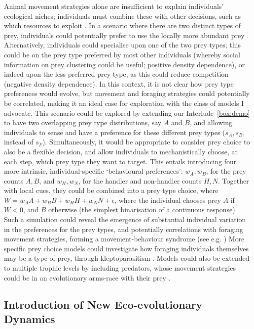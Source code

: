 Animal movement strategies alone are insufficient to explain individuals' ecological niches; individuals must combine these with other decisions, such as which resources to exploit \parencite{vangils2015,pulliam1974}.
In a scenario where there are two distinct types of prey, individuals could potentially prefer to use the locally more abundant prey \parencite{emlen1966,pulliam1974}.
Alternatively, individuals could specialise upon one of the two prey types; this could be on the prey type preferred by most other individuals (whereby social information on prey clustering could be useful; positive density dependence), or indeed upon the less preferred prey type, as this could reduce competition (negative density dependence).
In this context, it is not clear how prey type preferences would evolve, but movement and foraging strategies could potentially be correlated, making it an ideal case for exploration with the class of models I advocate.
This scenario could be explored by extending our Interlude~\ref{box:demo} to have two overlapping prey type distributions, say $A$ and $B$, and allowing individuals to sense and have a preference for these different prey types ($s_A, s_B$, instead of $s_F$).
Simultaneously, it would be appropriate to consider prey choice to also be a flexible decision, and allow individuals to mechanistically choose, at each step, which prey type they want to target.
This entails introducing four more intrinsic, individual-specific `behavioural preferences': $w_A, w_B$, for the prey counts $A, B$, and $w_H, w_N$, for the handler and non-handler counts $H, N$.
Together with local cues, they could be combined into a prey type choice, where $W = w_AA + w_BB + w_HH + w_NN + \epsilon$, where the individual chooses prey $A$ if $W < 0$, and $B$ otherwise (the simplest binarisation of a continuous response).
Such a simulation could reveal the emergence of substantial individual variation in the preferences for the prey types, and potentially correlations with foraging movement strategies, forming a movement-behaviour syndrome (see e.g. \cite{eckhardt1979})
More specific prey choice models could investigate how foraging individuals themselves may be a type of prey, through kleptoparasitism \parencite[see e.g.][]{gupte2021a}.
Models could also be extended to multiple trophic levels by including predators, whose movement strategies could be in an evolutionary arms-race with their prey \parencite{netz2021}.

\subsection*{Introduction of New Eco-evolutionary Dynamics}

